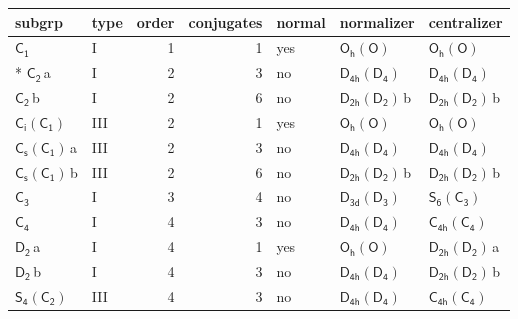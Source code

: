 \documentclass[10pt,a4paper]{article}
\numberwithin{equation}{section}
\newcommand{\grp}[1]{\mathsf{#1}}
\newcommand{\clsletter}[1]{\,{\scriptsize\color{black!55}#1}}
\begin{document}
{\small\begin{longtable}{@{}llrrlll@{}}\toprule
subgrp & type & order & conjugates & normal & normalizer & centralizer\\\midrule\endhead
\bottomrule\endfoot\endlastfoot
\href{../../../rotation/data/pdf/C1.pdf}{$\grp{C_{1}}$} & I & 1 & 1 & yes & \href{Oh-O.pdf}{$\grp{O_{h}}(\grp{O})$} & \href{Oh-O.pdf}{$\grp{O_{h}}(\grp{O})$}\\*
\href{../../../rotation/data/pdf/C2.pdf}{$\grp{C_{2}}$}\clsletter{a} & I & 2 & 3 & no & \href{D4h-D4.pdf}{$\grp{D_{4h}}(\grp{D_{4}})$} & \href{D4h-D4.pdf}{$\grp{D_{4h}}(\grp{D_{4}})$}\\
\href{../../../rotation/data/pdf/C2.pdf}{$\grp{C_{2}}$}\clsletter{b} & I & 2 & 6 & no & \href{D2h-D2.pdf}{$\grp{D_{2h}}(\grp{D_{2}})$}\clsletter{b} & \href{D2h-D2.pdf}{$\grp{D_{2h}}(\grp{D_{2}})$}\clsletter{b}\\
\href{S2-C1.pdf}{$\grp{C_{i}}(\grp{C_{1}})$} & III & 2 & 1 & yes & \href{Oh-O.pdf}{$\grp{O_{h}}(\grp{O})$} & \href{Oh-O.pdf}{$\grp{O_{h}}(\grp{O})$}\\
\href{C1v-C1.pdf}{$\grp{C_{s}}(\grp{C_{1}})$}\clsletter{a} & III & 2 & 3 & no & \href{D4h-D4.pdf}{$\grp{D_{4h}}(\grp{D_{4}})$} & \href{D4h-D4.pdf}{$\grp{D_{4h}}(\grp{D_{4}})$}\\
\href{C1v-C1.pdf}{$\grp{C_{s}}(\grp{C_{1}})$}\clsletter{b} & III & 2 & 6 & no & \href{D2h-D2.pdf}{$\grp{D_{2h}}(\grp{D_{2}})$}\clsletter{b} & \href{D2h-D2.pdf}{$\grp{D_{2h}}(\grp{D_{2}})$}\clsletter{b}\\
\href{../../../rotation/data/pdf/C3.pdf}{$\grp{C_{3}}$} & I & 3 & 4 & no & \href{D3d-D3.pdf}{$\grp{D_{3d}}(\grp{D_{3}})$} & \href{S6-C3.pdf}{$\grp{S_{6}}(\grp{C_{3}})$}\\
\href{../../../rotation/data/pdf/C4.pdf}{$\grp{C_{4}}$} & I & 4 & 3 & no & \href{D4h-D4.pdf}{$\grp{D_{4h}}(\grp{D_{4}})$} & \href{C4h-C4.pdf}{$\grp{C_{4h}}(\grp{C_{4}})$}\\
\href{../../../rotation/data/pdf/D2.pdf}{$\grp{D_{2}}$}\clsletter{a} & I & 4 & 1 & yes & \href{Oh-O.pdf}{$\grp{O_{h}}(\grp{O})$} & \href{D2h-D2.pdf}{$\grp{D_{2h}}(\grp{D_{2}})$}\clsletter{a}\\
\href{../../../rotation/data/pdf/D2.pdf}{$\grp{D_{2}}$}\clsletter{b} & I & 4 & 3 & no & \href{D4h-D4.pdf}{$\grp{D_{4h}}(\grp{D_{4}})$} & \href{D2h-D2.pdf}{$\grp{D_{2h}}(\grp{D_{2}})$}\clsletter{b}\\
\href{S4-C2.pdf}{$\grp{S_{4}}(\grp{C_{2}})$} & III & 4 & 3 & no & \href{D4h-D4.pdf}{$\grp{D_{4h}}(\grp{D_{4}})$} & \href{C4h-C4.pdf}{$\grp{C_{4h}}(\grp{C_{4}})$}\\

\end{longtable}}
\end{document}
